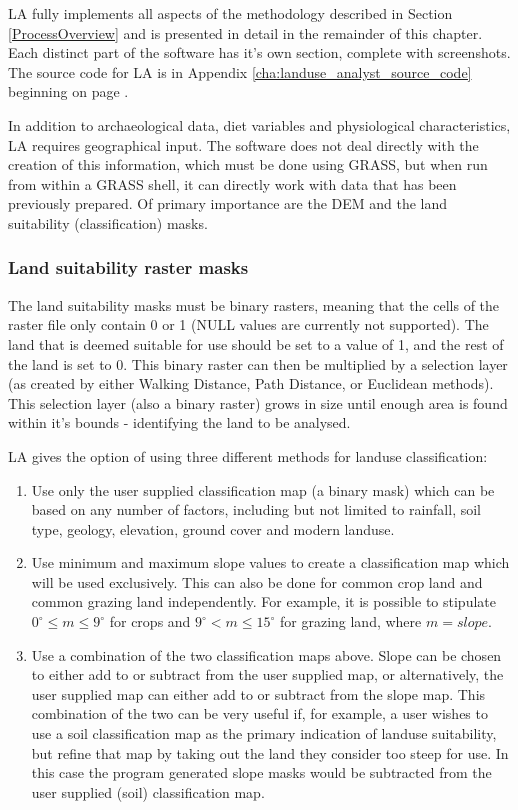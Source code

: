 LA fully implements all aspects of the methodology described in Section \ref{ProcessOverview} and is presented in detail in the remainder of this chapter.  Each distinct part of the software has it's own section, complete with screenshots.  The source code for LA is in Appendix \ref{cha:landuse_analyst_source_code} beginning on page \pageref{cha:landuse_analyst_source_code}.

In addition to archaeological data, diet variables and physiological characteristics, LA requires geographical input.  The software does not deal directly with the creation of this information, which must be done using GRASS, but when run from within a GRASS shell, it can directly work with data that has been previously prepared.  Of primary importance are the DEM and the land suitability (classification) masks.

\subsubsection{Land suitability raster masks}
The land suitability masks must %
be binary rasters, meaning that the cells of the raster file only contain 0 or 1 (NULL values are currently not supported). The land that is deemed suitable for use should be set to a value of 1, and the rest of the land is set to 0. This binary raster can then be multiplied by a selection layer (as created by either Walking Distance, Path Distance, or Euclidean methods). This selection layer (also a binary raster) grows in size until enough area is found within it's bounds - identifying the land to be analysed.

LA gives the option of using three different methods for landuse classification:
\begin{enumerate}
	\item Use only the user supplied classification map (a binary mask) which can be based on any number of factors, including but not limited to rainfall, soil type, geology, elevation, ground cover and modern landuse.
	\item Use minimum and maximum slope values to create a classification map which will be used exclusively. This can also be done for common crop land and common grazing land independently. For example, it is possible to stipulate $0^\circ \leq m \leq 9^\circ$ for crops and $9^\circ < m \leq 15^\circ$ for grazing land, where $m=slope$.  %
	\item Use a combination of the two classification maps above. Slope can be chosen to either add to or subtract from the user supplied map, or alternatively, the user supplied map can either add to or subtract from the slope map. This combination of the two can be very useful if, for example, a user wishes to use a soil classification map as the primary indication of landuse suitability, but refine that map by taking out the land they consider too steep for use. In this case the program generated slope masks would be subtracted from the user supplied (soil) classification map. 
\end{enumerate}

